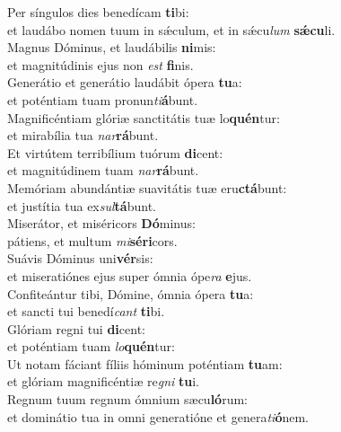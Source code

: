 \evenverse Per síngulos dies benedícam \textbf{ti}bi:~\*\\
\evenverse et laudábo nomen tuum in sǽculum, et in sǽcu\textit{lum} \textbf{sǽ}\textbf{cu}li.\\
\oddverse Magnus Dóminus, et laudábilis \textbf{ni}mis:~\*\\
\oddverse et magnitúdinis ejus non \textit{est} \textbf{fi}nis.\\
\evenverse Generátio et generátio laudábit ópera \textbf{tu}a:~\*\\
\evenverse et poténtiam tuam pronun\textit{ti}\textbf{á}bunt.\\
\oddverse Magnificéntiam glóriæ sanctitátis tuæ lo\textbf{quén}tur:~\*\\
\oddverse et mirabília tua \textit{nar}\textbf{rá}bunt.\\
\evenverse Et virtútem terribílium tuórum \textbf{di}cent:~\*\\
\evenverse et magnitúdinem tuam \textit{nar}\textbf{rá}bunt.\\
\oddverse Memóriam abundántiæ suavitátis tuæ eru\textbf{ctá}bunt:~\*\\
\oddverse et justítia tua ex\textit{sul}\textbf{tá}bunt.\\
\evenverse Miserátor, et miséricors \textbf{Dó}minus:~\*\\
\evenverse pátiens, et multum \textit{mi}\textbf{sé}\textbf{ri}cors.\\
\oddverse Suávis Dóminus uni\textbf{vér}sis:~\*\\
\oddverse et miseratiónes ejus super ómnia ópe\textit{ra} \textbf{e}jus.\\
\evenverse Confiteántur tibi, Dómine, ómnia ópera \textbf{tu}a:~\*\\
\evenverse et sancti tui benedí\textit{cant} \textbf{ti}bi.\\
\oddverse Glóriam regni tui \textbf{di}cent:~\*\\
\oddverse et poténtiam tuam \textit{lo}\textbf{quén}tur:\\
\evenverse Ut notam fáciant fíliis hóminum poténtiam \textbf{tu}am:~\*\\
\evenverse et glóriam magnificéntiæ re\textit{gni} \textbf{tu}i.\\
\oddverse Regnum tuum regnum ómnium sæcu\textbf{ló}rum:~\*\\
\oddverse et dominátio tua in omni generatióne et genera\textit{ti}\textbf{ó}nem.\\

